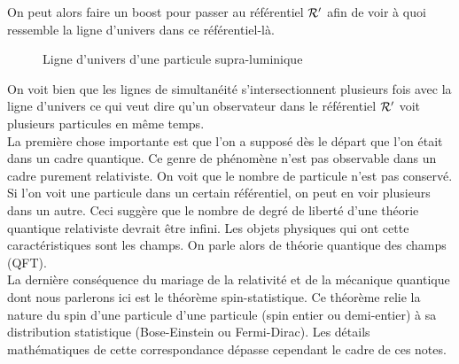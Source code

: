 \documentclass[a4paper,11pt]{report}
\begin{document}
            On peut alors faire un boost pour passer au référentiel $\mathcal{R}'$ afin de voir à quoi ressemble la ligne d'univers dans ce référentiel-là.
            
            \begin{figure}[H]
            \centering
            \caption{Ligne d'univers d'une particule supra-luminique}
            \end{figure}
            
            On voit bien que les lignes de simultanéité s'intersectionnent plusieurs fois avec la ligne d'univers ce qui veut dire qu'un observateur dans le référentiel $\mathcal{R}'$ voit plusieurs particules en même temps.\\
            
            La première chose importante est que l'on a supposé dès le départ que l'on était dans un cadre quantique. Ce genre de phénomène n'est pas observable dans un cadre purement relativiste. On voit que le nombre de particule n'est pas conservé. Si l'on voit une particule dans un certain référentiel, on peut en voir plusieurs dans un autre. Ceci suggère que le nombre de degré de liberté d'une théorie quantique relativiste devrait être infini. Les objets physiques qui ont cette caractéristiques sont les champs. On parle alors de théorie quantique des champs (QFT).\\
            
            La dernière conséquence du mariage de la relativité et de la mécanique quantique dont nous parlerons ici est le théorème spin-statistique. Ce théorème relie la nature du spin d'une particule d'une particule (spin entier ou demi-entier) à sa distribution statistique (Bose-Einstein ou Fermi-Dirac). Les détails mathématiques de cette correspondance dépasse cependant le cadre de ces notes.
\end{document}
